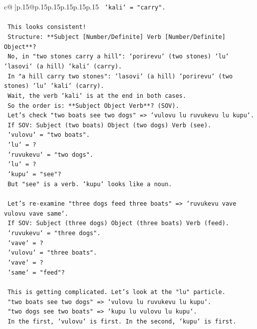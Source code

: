 \documentclass{article}
\begin{document}
{\begin{supertabular}{c@{$\;$}|p{.15\linewidth}@{}p{.15\linewidth}p{.15\linewidth}p{.15\linewidth}p{.15\linewidth}p{.15\linewidth}}
{{{\texttt{   `kali` = "carry".} \\
\\ 
\texttt{   This looks consistent!} \\
\texttt{   Structure: **Subject {[}Number/Definite{]} Verb {[}Number/Definite{]} Object**?} \\
\texttt{   No, in "two stones carry a hill": `porirevu` (two stones) `lu` `lasovi` (a hill) `kali` (carry).} \\
\texttt{   In "a hill carry two stones": `lasovi` (a hill) `porirevu` (two stones) `lu` `kali` (carry).} \\
\texttt{   Wait, the verb `kali` is at the end in both cases.} \\
\texttt{   So the order is: **Subject Object Verb**? (SOV).} \\
\texttt{   Let's check "two boats see two dogs" => `vulovu lu ruvukevu lu kupu`.} \\
\texttt{   If SOV: Subject (two boats) Object (two dogs) Verb (see).} \\
\texttt{   `vulovu` = "two boats".} \\
\texttt{   `lu` = ?} \\
\texttt{   `ruvukevu` = "two dogs".} \\
\texttt{   `lu` = ?} \\
\texttt{   `kupu` = "see"?} \\
\texttt{   But "see" is a verb. `kupu` looks like a noun.} \\
\\ 
\texttt{   Let's re{-}examine "three dogs feed three boats" => `ruvukevu vave vulovu vave same`.} \\
\texttt{   If SOV: Subject (three dogs) Object (three boats) Verb (feed).} \\
\texttt{   `ruvukevu` = "three dogs".} \\
\texttt{   `vave` = ?} \\
\texttt{   `vulovu` = "three boats".} \\
\texttt{   `vave` = ?} \\
\texttt{   `same` = "feed"?} \\
\\ 
\texttt{   This is getting complicated. Let's look at the "lu" particle.} \\
\texttt{   "two boats see two dogs" => `vulovu lu ruvukevu lu kupu`.} \\
\texttt{   "two dogs see two boats" => `kupu lu vulovu lu kupu`.} \\
\texttt{   In the first, `vulovu` is first. In the second, `kupu` is first.} \\
}}}
\end{supertabular}}
\end{document}
